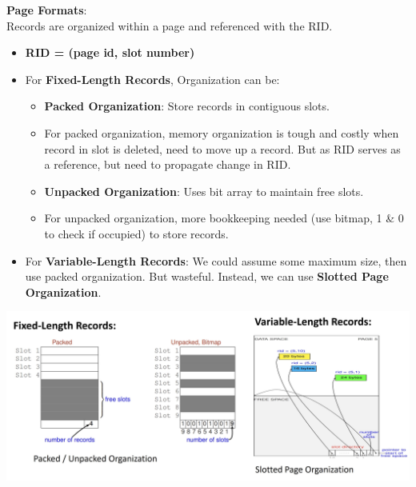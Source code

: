 \documentclass[10pt, landscape]{article}
\begin{document}
\begin{multicols*}{3}
\textbf{Page Formats}: \\
Records are organized within a page and referenced with the RID.
\begin{itemize}
\item \textbf{RID = (page id, slot number)}
\item For \textbf{Fixed-Length Records}, Organization can be:
\begin{itemize}
\item \textbf{Packed Organization}: Store records in contiguous slots. 
\item  For packed organization, memory organization is tough and costly when record in slot is deleted, need to move up a record. But as RID serves as a reference, but need to propagate change in RID.
\item \textbf{Unpacked Organization}: Uses bit array to maintain free slots.
\item For unpacked organization, more bookkeeping needed (use bitmap, 1 \& 0 to check if occupied) to store records.
\end{itemize}
\item For \textbf{Variable-Length Records}: We could assume some maximum size, then use packed organization. But wasteful. Instead, we can use \textbf{Slotted Page Organization}.
\end{itemize}
\centerline{\includegraphics[width = 1\linewidth]{pageFormats}}


\end{multicols*}
\end{document}
